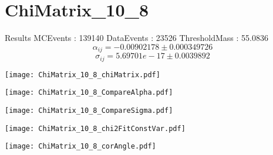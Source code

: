 \documentclass[a4paper,12pt]{article}
\begin{document}
\section{ChiMatrix\_10\_8}
\begin{minipage}{0.49\linewidth} Results \newline
MCEvents : 139140\newline
DataEvents : 23526 \newline
ThresholdMass : 55.0836\\
$$\alpha_{ij} = -0.00902178\pm 0.000349726$$
$$\sigma_{ij} = 5.69701e-17\pm 0.0039892$$
\end{minipage}\hfill
\begin{minipage}{0.49\linewidth} 
\texttt{[image: ChiMatrix\_10\_8\_chiMatrix.pdf]}\\
\end{minipage}
\hfill
\begin{minipage}{0.49\linewidth} 
\texttt{[image: ChiMatrix\_10\_8\_CompareAlpha.pdf]}\\
\end{minipage}
\hfill
\begin{minipage}{0.49\linewidth} 
\texttt{[image: ChiMatrix\_10\_8\_CompareSigma.pdf]}\\
\end{minipage}
\begin{minipage}{0.49\linewidth} 
\texttt{[image: ChiMatrix\_10\_8\_chi2FitConstVar.pdf]}\\
\end{minipage}
\hfill
\begin{minipage}{0.49\linewidth} 
\texttt{[image: ChiMatrix\_10\_8\_corAngle.pdf]}\\
\end{minipage}
\end{document}
